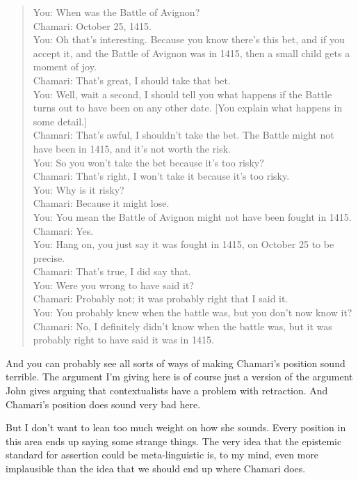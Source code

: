 \documentclass[11pt,]{book}
\begin{document}
\begin{quote}
You: When was the Battle of Avignon?\\
Chamari: October 25, 1415.\\
You: Oh that's interesting. Because you know there's this bet, and if you accept it, and the Battle of Avignon was in 1415, then a small child gets a moment of joy.\\
Chamari: That's great, I should take that bet.\\
You: Well, wait a second, I should tell you what happens if the Battle turns out to have been on any other date. {[}You explain what happens in some detail.{]}\\
Chamari: That's awful, I shouldn't take the bet. The Battle might not have been in 1415, and it's not worth the risk.\\
You: So you won't take the bet because it's too risky?\\
Chamari: That's right, I won't take it because it's too risky.\\
You: Why is it risky?\\
Chamari: Because it might lose.\\
You: You mean the Battle of Avignon might not have been fought in 1415.\\
Chamari: Yes.\\
You: Hang on, you just say it was fought in 1415, on October 25 to be precise.\\
Chamari: That's true, I did say that.\\
You: Were you wrong to have said it?\\
Chamari: Probably not; it was probably right that I said it.\\
You: You probably knew when the battle was, but you don't now know it?\\
Chamari: No, I definitely didn't know when the battle was, but it was probably right to have said it was in 1415.
\end{quote}

And you can probably see all sorts of ways of making Chamari's position sound terrible. The argument I'm giving here is of course just a version of the argument John \citet{McFarlane2005-Knowledge} gives arguing that contextualists have a problem with retraction. And Chamari's position does sound very bad here.

But I don't want to lean too much weight on how she sounds. Every position in this area ends up saying some strange things. The very idea that the epistemic standard for assertion could be meta-linguistic is, to my mind, even more implausible than the idea that we should end up where Chamari does.
\end{document}
